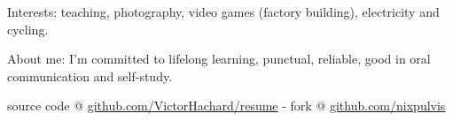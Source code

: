 





\vspace{4px}









\vspace{10px}

\begin{indentsection}{\parindent}
\begin{description*}
  \item[Interests:]
    teaching, photography, video games (factory building), electricity and cycling.
  \item[About me:]
    I’m committed to lifelong learning, punctual, reliable,
    good in oral communication and self-study.
\end{description*}
\end{indentsection}

\vspace{4px}

\begin{center}
\footnotesize \latex source code @
\href{http://www.github.com/VictorHachard/resume}
{github.com/VictorHachard/resume} - fork @
\href{http://www.github.com/nixpulvis}
{github.com/nixpulvis}
\end{center}

